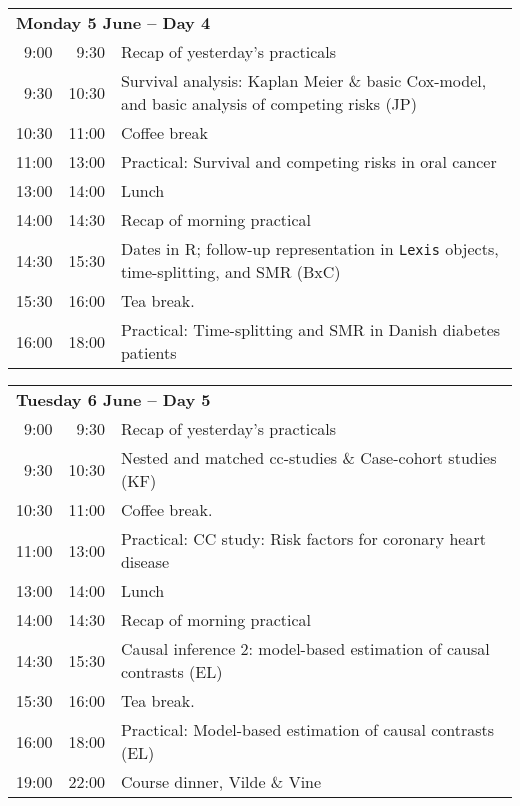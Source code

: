 \noindent
\begin{tabular}{r@{ -- }rp{13cm}}
\multicolumn{3}{l}{\bf Monday 5 June -- Day 4} \\
 9:00 &  9:30 & Recap of yesterday's practicals \\
 9:30 & 10:30 & Survival analysis: Kaplan Meier \& basic
                Cox-model, and basic analysis of competing risks (JP)\\ %
10:30 & 11:00 & Coffee break\\
11:00 & 13:00 & Practical: Survival and competing risks in oral cancer\\ %
13:00 & 14:00 & Lunch \\
14:00 & 14:30 & Recap of morning practical \\
14:30 & 15:30 & Dates in R; follow-up representation in \texttt{Lexis} objects,
                time-splitting,  and SMR (BxC)\\
15:30 & 16:00 & Tea break. \\
16:00 & 18:00 & Practical: Time-splitting and SMR in Danish diabetes
                patients\\[1em] %
\end{tabular}

\noindent
\begin{tabular}{r@{ -- }rp{13cm}}
\multicolumn{3}{l}{\bf Tuesday 6 June -- Day 5} \\
 9:00 &  9:30 & Recap of yesterday's practicals \\
 9:30 & 10:30 & Nested and matched cc-studies \& Case-cohort studies (KF)\\
10:30 & 11:00 & Coffee break. \\
11:00 & 13:00 & Practical: CC study: Risk factors for coronary heart
                disease\\ %
13:00 & 14:00 & Lunch \\
14:00 & 14:30 & Recap of morning practical \\
14:30 & 15:30 & Causal inference 2: model-based estimation of causal
                contrasts (EL)\\ %
15:30 & 16:00 & Tea break. \\
16:00 & 18:00 & Practical: Model-based estimation of causal
                contrasts (EL)\\ %
19:00 & 22:00 & Course dinner, Vilde \& Vine\\[1em]
\end{tabular}


